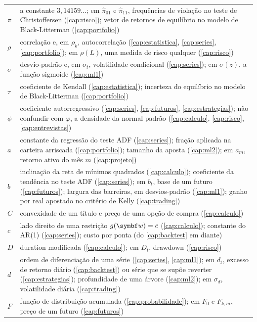 \begin{longtable}{>{\raggedright\arraybackslash}p{12mm} >{\raggedright\arraybackslash}p{97mm}}
$\pi$ & a constante $3,14159\ldots$; em $\hat\pi_{01}$ e $\hat\pi_{11}$, frequências de violação no teste de Christoffersen (\ref{cap:risco}); vetor de retornos de equilíbrio no modelo de Black-Litterman (\ref{cap:portfolio}) \\
$\rho$ & correlação e, em $\rho_k$, autocorrelação (\ref{cap:estatistica}, \ref{cap:series}, \ref{cap:portfolio}); em $\rho(L)$, uma medida de risco qualquer (\ref{cap:risco}) \\
$\sigma$ & desvio-padrão e, em $\sigma_t$, volatilidade condicional (\ref{cap:series}); em $\sigma(z)$, a função sigmoide (\ref{cap:ml1}) \\
$\tau$ & coeficiente de Kendall (\ref{cap:estatistica}); incerteza do equilíbrio no modelo de Black-Litterman (\ref{cap:portfolio}) \\
$\phi$ & coeficiente autorregressivo (\ref{cap:series}, \ref{cap:futuros}, \ref{cap:estrategias}); não confundir com $\varphi$, a densidade da normal padrão (\ref{cap:calculo}, \ref{cap:risco}, \ref{cap:entrevistas}) \\
$a$ & constante da regressão do teste ADF (\ref{cap:series}); fração aplicada na carteira arriscada (\ref{cap:portfolio}); tamanho da aposta (\ref{cap:ml2}); em $a_m$, retorno ativo do mês $m$ (\ref{cap:projeto}) \\
$b$ & inclinação da reta de mínimos quadrados (\ref{cap:calculo}); coeficiente da tendência no teste ADF (\ref{cap:series}); em $b_t$, base de um futuro (\ref{cap:futuros}); largura das barreiras, em desvios-padrão (\ref{cap:ml1}); ganho por real apostado no critério de Kelly (\ref{cap:trading}) \\
$C$ & convexidade de um título e preço de uma opção de compra (\ref{cap:calculo}) \\
$c$ & lado direito de uma restrição $g(\vetor{w}) = c$ (\ref{cap:calculo}); constante do AR(1) (\ref{cap:series}); custo por ponta (do \ref{cap:backtest} em diante) \\
$D$ & duration modificada (\ref{cap:calculo}); em $D_t$, drawdown (\ref{cap:risco}) \\
$d$ & ordem de diferenciação de uma série (\ref{cap:series}, \ref{cap:ml1}); em $d_t$, excesso de retorno diário (\ref{cap:backtest}) ou série que se supõe reverter (\ref{cap:estrategias}); profundidade de uma árvore (\ref{cap:ml2}); em $\sigma_d$, volatilidade diária (\ref{cap:trading}) \\
$F$ & função de distribuição acumulada (\ref{cap:probabilidade}); em $F_0$ e $F_{k,m}$, preço de um futuro (\ref{cap:futuros}) \\

\end{longtable}
